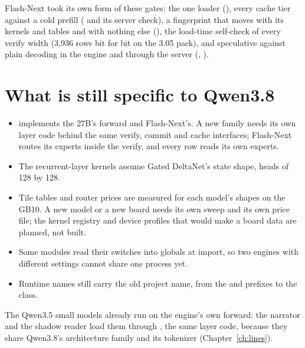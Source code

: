 Flash-Next took its own form of these gates: the one loader (), every cache tier against a cold prefill ( and its server check), a fingerprint that moves with its kernels and tables and with nothing else (), the load-time self-check of every verify width (3,936 rows bit for bit on the 3.05 pack), and speculative against plain decoding in the engine and through the server (, ).

\section{What is still specific to Qwen3.8}

\begin{itemize}
\item {} implements the 27B's forward and  Flash-Next's. A new family needs its own layer code behind the same verify, commit and cache interfaces; Flash-Next routes its experts inside the verify, and every row reads its own experts.
\item The recurrent-layer kernels assume Gated DeltaNet's state shape, heads of 128 by 128.
\item Tile tables and router prices are measured for each model's shapes on the GB10. A new model or a new board needs its own sweep and its own price file; the kernel registry and device profiles that would make a board data are planned, not built.
\item Some modules read their switches into globals at import, so two engines with different settings cannot share one process yet.
\item Runtime names still carry the old project name, from the  and  prefixes to the  class.
\end{itemize}

The Qwen3.5 small models already run on the engine's own forward: the narrator and the shadow reader load them through , the same layer code, because they share Qwen3.8's architecture family and its tokenizer (Chapter~\ref{ch:lines}).
